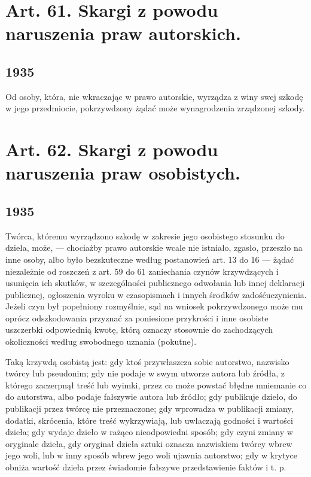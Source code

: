 \documentclass[withmarginpar]{book}
\begin{document}
\section{Art. 61. Skargi z powodu naruszenia praw autorskich.}
\label{sec:art.-61}
\subsection{1935}
\label{sec:art.-61-1}

Od osoby, która, nie wkraczając w prawo autorskie, wyrządza z winy
swej szkodę w jego przedmiocie, pokrzywdzony żądać może wynagrodzenia
zrządzonej szkody.

\section{Art. 62. Skargi z powodu naruszenia praw osobistych.}
\label{sec:art.-62}
\subsection{1935}
\label{sec:art.-62-1}

Twórca, któremu wyrządzono szkodę w zakresie jego osobistego stosunku
do dzieła, może, — chociażby prawo autorskie wcale nie istniało,
zgasło, przeszło na inne osoby, albo było bezskuteczne według
postanowień art. 13 do 16 — żądać niezależnie od roszczeń z art. 59 do
61 zaniechania czynów krzywdzących i usunięcia ich skutków, w
szczególności publicznego odwołania lub innej deklaracji publicznej,
ogłoszenia wyroku w czasopismach i innych środków
zadośćuczynienia. Jeżeli czyn był popełniony rozmyślnie, sąd na
wniosek pokrzywdzonego może mu oprócz odszkodowania przyznać za
poniesione przykrości i inne osobiste uszczerbki odpowiednią kwotę,
którą oznaczy stosownie do zachodzących okoliczności według swobodnego
uznania (pokutne).

Taką krzywdą osobistą jest: gdy ktoś przywłaszcza sobie autorstwo,
nazwisko twórcy lub pseudonim; gdy nie podaje w swym utworze autora
lub źródła, z którego zaczerpnął treść lub wyimki, przez co może
powstać błędne mniemanie co do autorstwa, albo podaje fałszywie autora
lub źródło; gdy publikuje dzieło, do publikacji przez twórcę nie
przeznaczone; gdy wprowadza w publikacji zmiany, dodatki, skrócenia,
które treść wykrzywiają, lub uwłaczają godności i wartości dzieła; gdy
wydaje dzieło w rażąco nieodpowiedni sposób; gdy czyni zmiany w
oryginale dzieła, gdy oryginał dzieła sztuki oznacza nazwiskiem twórcy
wbrew jego woli, lub w inny sposób wbrew jego woli ujawnia autorstwo;
gdy w krytyce obniża wartość dzieła przez świadomie fałszywe
przedstawienie faktów i t. p.
\end{document}
